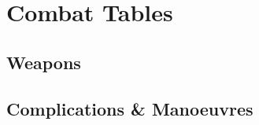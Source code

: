 
\vspace{-3\baselineskip}
\section{Combat Tables}
\label{combatAppendix}

\chasechart

\begin{multicols}{2}

\initiativechart

\armourchart

\shieldchart

\end{multicols}

\huntchart

\subsection{Weapons}

\improvisedWeaponsChart

\weaponsChart

\esotericWeaponsChart

\pagebreak

\subsection{Complications \& Manoeuvres}


\printindex[spells]

\pagebreak

\printindex

